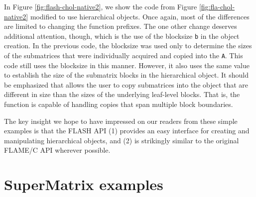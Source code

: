 In Figure \ref{fig:flash-chol-native2}, we show the code from Figure
\ref{fig:fla-chol-native2} modified to use hierarchical objects.
Once again, most of the differences are limited to changing the
function prefixes.
The one other change deserves additional attention, though, which
is the use of the blocksize {\tt b} in the object creation.
In the previous code, the blocksize was used only to determine the
sizes of the submatrices that were individually acquired and copied
into the {\tt A}.
This code still uses the blocksize in this manner.
However, it also uses the same value to establish the size of the
submatrix blocks in the hierarchical object.
It should be emphasized that \flashcopyflattohier allows
the user to copy submatrices into the object that are different in size
than the sizes of the underlying leaf-level blocks.
That is, the function is capable of handling copies that span multiple
block boundaries.

The key insight we hope to have impressed on our readers from these
simple examples is that the FLASH API (1) provides an easy interface for
creating and manipulating hierarchical objects, and (2) is strikingly
similar to the original FLAME/C API wherever possible.



\section{SuperMatrix examples}
\label{sec:sm-examples}



